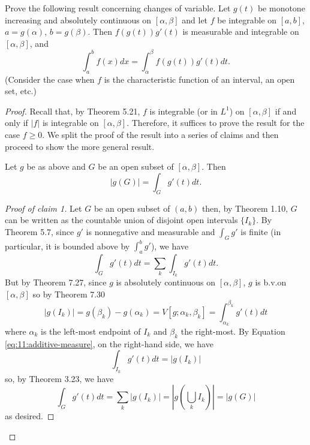 
\begin{problem}
Prove the following result concerning changes of variable. Let $g(t)$ be
monotone increasing and absolutely continuous on $[\alpha,\beta]$ and let $f$
be integrable on $[a,b]$, $a= g(\alpha)$, $b=
g(\beta)$. Then $f(g(t))g'(t)$ is measurable and integrable on
$[\alpha,\beta]$, and
\[
\int_a^b f(x)d x=\int_\alpha^\beta f(g(t))g'(t)d t.
\]
(Consider the case when $f$ is the characteristic function of an interval,
an open set, etc.)
\end{problem}
\begin{proof}
Recall that, by Theorem 5.21, $f$ is integrable (or in $L^1$) on
$[\alpha,\beta]$ if and only if $|f|$ is integrable on
$[\alpha,\beta]$. Therefore, it suffices to prove the result for the case
$f\geq 0$. We split the proof of the result into a series of claims and
then proceed to show the more general result.
\begin{claim}
Let $g$ be as above and $G$ be an open subset of $[\alpha,\beta]$. Then
\[
|g(G)|=\int_G g'(t)dt.
\]
\end{claim}
\begin{proof}[Proof of claim 1]
\renewcommand\qedsymbol{$\clubsuit$}
Let $G$ be an open subset of $(a,b)$ then, by Theorem 1.10, $G$ can be
written as the countable union of disjoint open intervals $\{I_k\}$. By
Theorem 5.7, since $g'$ is nonnegative and measurable and
$\int_Gg'$ is finite (in particular, it is bounded above by $\int_a^bg'$),
we have
\begin{equation}
\label{eq:11:additive-measure}
\int_Gg'(t)dt=\sum_k\int_{I_k}g'(t)dt.
\end{equation}
But by Theorem 7.27, since $g$ is absolutely continuous on
$[\alpha,\beta]$, $g$ is b.v.\@ on $[\alpha,\beta]$ so by Theorem 7.30
\[
|g(I_k)|
=g(\beta_k)-g(\alpha_k)
=V[g;\alpha_k,\beta_k]
=\int_{\alpha_k}^{\beta_k}g'(t)dt
\]
where $\alpha_k$ is the left-most endpoint of $I_k$ and $\beta_k$ the
right-most. By Equation \eqref{eq:11:additive-measure}, on the right-hand
side, we have
\[
\int_{I_k}g'(t)dt=|g(I_k)|
\]
so, by Theorem 3.23, we have
\begin{equation}
\label{eq:11:measure-sum-integral-dev}
\int_G g'(t)dt
=\sum_k|g(I_k)|
=\left|g\left({\textstyle\bigcup_k I_k}\right)\right|
=|g(G)|
\end{equation}
as desired.
\end{proof}

\end{proof}
